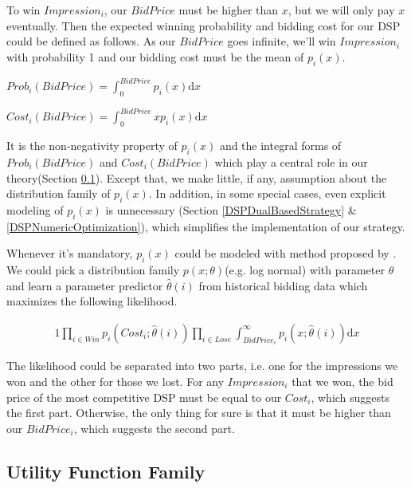 \documentclass[sigconf]{acmart}
\begin{document}
To win $Impression_i$, our $BidPrice$ must be higher than $x$, but we will only pay $x$ eventually.
Then the expected winning probability and bidding cost for our DSP could be defined as follows.
As our $BidPrice$ goes infinite, we'll win $Impression_i$ with probability 1 and our bidding cost must be the mean of $p_i(x)$.

\begin{definition}
$Prob_i(BidPrice)= \int_0^{BidPrice} p_i(x) \mathrm{d} x$
\end{definition}

\begin{definition}
$Cost_i(BidPrice)= \int_0^{BidPrice} x p_i(x) \mathrm{d} x$
\end{definition}

It is the non-negativity property of $p_i(x)$ and the integral forms of $Prob_i(BidPrice)$ and $Cost_i(BidPrice)$
    which play a central role in our theory(Section \ref{UtilityFunctionFamily}).
Except that, we make little, if any, assumption about the distribution family of $p_i(x)$.
In addition, in some special cases, even explicit modeling of $p_i(x)$ is unnecessary
    (Section \ref{DSPDualBasedStrategy} \& \ref{DSPNumericOptimization}), which simplifies the implementation of our strategy.

Whenever it's mandatory, $p_i(x)$ could be modeled with method proposed by \cite{Wu2015}.
We could pick a distribution family $p(x; \theta)$(e.g. log normal) with parameter $\theta$ and
    learn a parameter predictor $\hat\theta(i)$ from historical bidding data which maximizes the following likelihood.

\begin{alignat}{1}
\prod\limits_{i \in Win} p_i(Cost_i; \hat\theta(i)) \prod\limits_{i \in Lose} \int_{BidPrice_i}^{\infty} p_i(x; \hat\theta(i)) \mathrm{d} x
\end{alignat}

The likelihood could be separated into two parts, i.e. one for the impressions we won and the other for those we lost.
For any $Impression_i$ that we won, the bid price of the most competitive DSP must be equal to our $Cost_i$, which suggests the first part.
Otherwise, the only thing for sure is that it must be higher than our $BidPrice_i$, which suggests the second part.

\subsection{Utility Function Family} \label{UtilityFunctionFamily}
\end{document}

